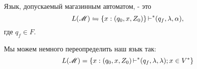 \begin{definition}
Язык, допускаемый магазинным автоматом, - это
\[
L(\mathscr{M}) \leftrightharpoons \{x: (q_0,x,Z_0)\} \operatorname{\vdash}^{*} (q_f, \lambda, \alpha),
\]
где $q_f \in F$.

\medskip

Мы можем немного переопределить наш язык так:
\[
    L(\mathscr{M}) = \{x: (q_0,x,Z_0) \operatorname{\vdash}^{*} (q_f, \lambda, \lambda); x\in V^{*} \}
\] 
\end{definition}




\title{}
\author{Козырнов Александр Дмитриевич, ИУ7-32Б}
\date{\today}




